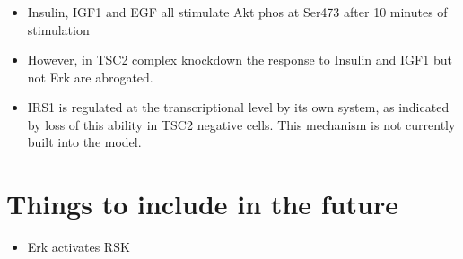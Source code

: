 \documentclass{beamer}
\begin{document}
    \begin{frame}
        \frametitle{ \cite{Harrington2004}}
    \begin{itemize}
        \item Insulin, IGF1 and EGF all stimulate Akt phos at Ser473 after 10 minutes of stimulation
        \item However, in TSC2 complex knockdown the response to Insulin and IGF1 but not Erk are abrogated.
        \item IRS1 is regulated at the transcriptional level by its own system, as indicated by loss of this ability in TSC2 negative cells. This mechanism is not currently built into the model.
    \end{itemize}
    \end{frame}




\section{Things to include in the future}
    \cite{Roux2007}
    \begin{itemize}
        \item Erk activates RSK
    \end{itemize}
\end{document}
